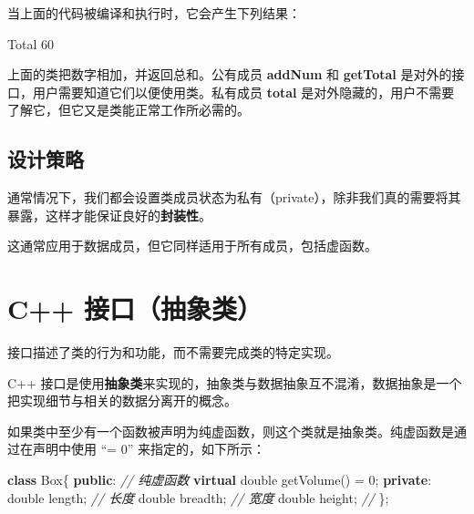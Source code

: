 \documentclass[
]{article}
\newenvironment{Shaded}{}{}
\newcommand{\CommentTok}[1]{\textcolor[rgb]{0.38,0.63,0.69}{\textit{#1}}}
\newcommand{\DataTypeTok}[1]{\textcolor[rgb]{0.56,0.13,0.00}{#1}}
\newcommand{\DecValTok}[1]{\textcolor[rgb]{0.25,0.63,0.44}{#1}}
\newcommand{\KeywordTok}[1]{\textcolor[rgb]{0.00,0.44,0.13}{\textbf{#1}}}
\newcommand{\NormalTok}[1]{#1}
\newcommand{\OperatorTok}[1]{\textcolor[rgb]{0.40,0.40,0.40}{#1}}
\begin{document}
当上面的代码被编译和执行时，它会产生下列结果：

\begin{Shaded}
\begin{Highlighting}[]
\NormalTok{Total }\DecValTok{60}
\end{Highlighting}
\end{Shaded}

上面的类把数字相加，并返回总和。公有成员 \textbf{addNum} 和
\textbf{getTotal} 是对外的接口，用户需要知道它们以便使用类。私有成员
\textbf{total}
是对外隐藏的，用户不需要了解它，但它又是类能正常工作所必需的。

\hypertarget{ux8bbeux8ba1ux7b56ux7565-1}{%
\subsection{设计策略}\label{ux8bbeux8ba1ux7b56ux7565-1}}

通常情况下，我们都会设置类成员状态为私有（private），除非我们真的需要将其暴露，这样才能保证良好的\textbf{封装性}。

这通常应用于数据成员，但它同样适用于所有成员，包括虚函数。

\hypertarget{c-ux63a5ux53e3ux62bdux8c61ux7c7b}{%
\section{C++ 接口（抽象类）}\label{c-ux63a5ux53e3ux62bdux8c61ux7c7b}}

接口描述了类的行为和功能，而不需要完成类的特定实现。

C++
接口是使用\textbf{抽象类}来实现的，抽象类与数据抽象互不混淆，数据抽象是一个把实现细节与相关的数据分离开的概念。

如果类中至少有一个函数被声明为纯虚函数，则这个类就是抽象类。纯虚函数是通过在声明中使用
``= 0'' 来指定的，如下所示：

\begin{Shaded}
\begin{Highlighting}[]
\KeywordTok{class}\NormalTok{ Box}\OperatorTok{\{}
   \KeywordTok{public}\OperatorTok{:}
      \CommentTok{// 纯虚函数}
      \KeywordTok{virtual} \DataTypeTok{double}\NormalTok{ getVolume}\OperatorTok{()} \OperatorTok{=} \DecValTok{0}\OperatorTok{;}
   \KeywordTok{private}\OperatorTok{:}
      \DataTypeTok{double}\NormalTok{ length}\OperatorTok{;}      \CommentTok{// 长度}
      \DataTypeTok{double}\NormalTok{ breadth}\OperatorTok{;}     \CommentTok{// 宽度}
      \DataTypeTok{double}\NormalTok{ height}\OperatorTok{;}      \CommentTok{// }
\OperatorTok{\};}
\end{Highlighting}
\end{Shaded}
\end{document}
